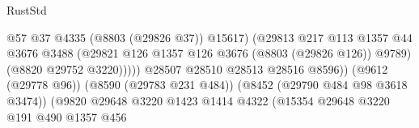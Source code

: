 \begin{lexlean}{RustStd}
\begin{coremodule}
                                                            @57
                                                            @37
                                                            @4335
                                                            (@8803 (@29826 @37))
                                                            @15617)
                                                          (@29813
                                                            @217
                                                            @113
                                                            @1357
                                                            @44
                                                            @3676
                                                            @3488
                                                            (@29821
                                                              @126
                                                              @1357
                                                              @126
                                                              @3676
                                                              (@8803 (@29826 @126))
                                                              @9789)
                                                            (@8820 @29752 @3220)))))
                                                    @28507
                                                    @28510
                                                    @28513
                                                    @28516
                                                    @8596))
                                                (@9612 (@29778 @96))
                                                (@8590 (@29783 @231 @484))
                                                (@8452 (@29790 @484 @98 @3618 @3474))
                                                (@9820
                                                  @29648
                                                  @3220
                                                  @1423
                                                  @1414
                                                  @4322
                                                  (@15354
                                                    @29648
                                                    @3220
                                                    @191
                                                    @490
                                                    @1357
                                                    @456

\end{coremodule}
\end{lexlean}
